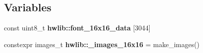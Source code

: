 \subsection*{Variables}
\begin{DoxyCompactItemize}
\item 
\mbox{\label{namespacehwlib_a204b9f4037789a37298391c58aa3e653}} 
const uint8\+\_\+t {\bfseries hwlib\+::font\+\_\+16x16\+\_\+data} \mbox{[}3044\mbox{]}
\item 
\mbox{\label{namespacehwlib_a06e20968ae838a64c37847d1e56e449a}} 
constexpr images\+\_\+t {\bfseries hwlib\+::\+\_\+images\+\_\+16x16} = make\+\_\+images()
\end{DoxyCompactItemize}
